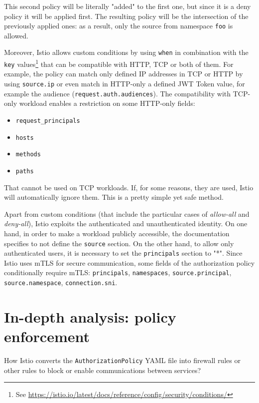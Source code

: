 \noindent This second policy will be literally "added" to the first one, but since it is a deny policy it will be applied first. The resulting policy will be the intersection of the previously applied ones: as a result, only the source from namespace \texttt{foo} is allowed. 

Moreover, Istio allows custom conditions by using \texttt{when} in combination with the \texttt{key} values\footnote{See \url{https://istio.io/latest/docs/reference/config/security/conditions/}} that can be compatible with HTTP, TCP or both of them. For example, the policy can match only defined IP addresses in TCP or HTTP by using \texttt{source.ip} or even match in HTTP-only a defined JWT Token value, for example the audience (\texttt{request.auth.audiences}). The compatibility with TCP-only workload enables a restriction on some HTTP-only fields: 

\begin{itemize}
    \item \texttt{request\_principals}
    \item \texttt{hosts}
    \item \texttt{methods}
    \item \texttt{paths}
\end{itemize}

\noindent That cannot be used on TCP workloads. If, for some reasons, they are used, Istio will automatically ignore them. This is a pretty simple yet safe method.

Apart from custom conditions (that include the particular cases of \textit{allow-all} and \textit{deny-all}), Istio exploits the authenticated and unauthenticated identity. On one hand, in order to make a workload publicly accessible, the documentation specifies to not define the \texttt{source} section. On the other hand, to allow only authenticated users, it is necessary to set the \texttt{principals} section to "*". Since Istio uses mTLS for secure communication, some fields of the authorization policy conditionally require mTLS: \texttt{principals}, \texttt{namespaces}, \texttt{source.principal}, \texttt{source.namespace}, \texttt{connection.sni}.

\section{In-depth analysis: policy enforcement}
How Istio converts the \texttt{AuthorizationPolicy} YAML file into firewall rules or other rules to block or enable communications between services? 

